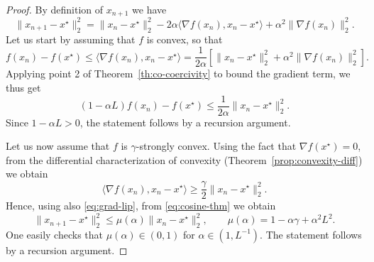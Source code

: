 \documentclass{report}
\begin{document}

\begin{proof}
	By definition of $x_{n+1}$ we have
	\begin{equation}
		\label{eq:cosine-thm}
		\|x_{n+1}-x^\star \|_2^2 
		= \|x_n - x^\star\|_2^2 - 2 \alpha \langle \nabla f(x_n),x_n-x^\star \rangle  + \alpha^2 \|\nabla f(x_n)\|_2^2 .
	\end{equation}
	Let us start by assuming that $f$ is convex, so that
	\begin{equation}
		f(x_n)-f(x^\star) \le \langle \nabla f(x_n), x_n-x^\star \rangle 
		= \frac{1}{2\alpha} \left[ \|x_n - x^\star\|_2^2 + \alpha^2 \|\nabla f(x_n)\|_2^2  \right].
	\end{equation}
	Applying point 2 of Theorem~\ref{th:co-coercivity} to bound the gradient term, we thus get 
	\begin{equation}
		\left(1-{\alpha}{L}\right) f(x_n)-f(x^\star) \le \frac{1}{2\alpha}\|x_n - x^\star\|_2^2 .
	\end{equation}
	Since $1-{\alpha}{L}> 0$, the statement follows by a recursion argument.
	
	Let us now assume that $f$ is $\gamma$-strongly convex. Using the fact that $\nabla f(x^\star)=0$, from the differential characterization of convexity (Theorem~\ref{prop:convexity-diff}) we obtain
	\begin{equation}
		\langle\nabla f(x_n),x_n-x^\star\rangle \ge \frac\gamma2\|x_n-x^\star\|_2^2.
	\end{equation}
	Hence, using also \eqref{eq:grad-lip}, from \eqref{eq:cosine-thm} we obtain
	\begin{equation}
		\|x_{n+1}-x^\star \|_2^2 \le \mu(\alpha)\|x_n - x^\star\|_2^2, \qquad \mu(\alpha) = 1 - \alpha \gamma + \alpha^2 L^2  .
	\end{equation}
	One easily checks that $\mu(\alpha)\in (0,1)$ for $\alpha\in (1,L^{-1})$. The statement follows by a recursion argument.
\end{proof}
\end{document}
